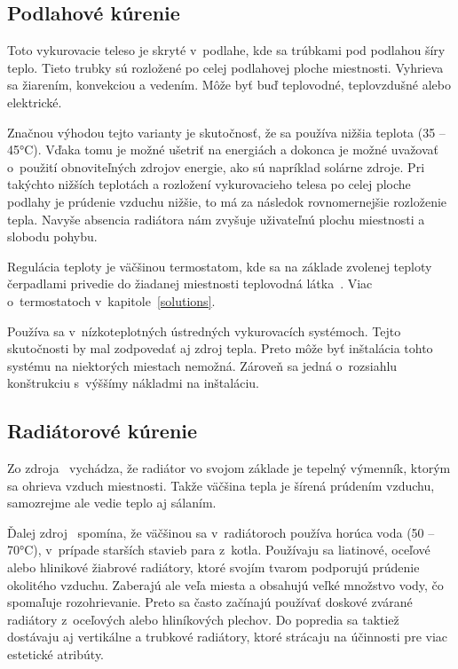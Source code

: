 \subsection*{Podlahové kúrenie}
Toto vykurovacie teleso je skryté v~podlahe, kde sa trúbkami pod podlahou šíry teplo. 
Tieto trubky sú rozložené po celej podlahovej ploche miestnosti. Vyhrieva sa žiarením, konvekciou a vedením. 
Môže byť buď teplovodné, teplovzdušné alebo elektrické.~\cite{tuffin_2018}

Značnou výhodou tejto varianty je skutočnosť, že sa používa nižšia teplota (35 – 45°C). 
Vďaka tomu je možné ušetriť na energiách a dokonca je možné uvažovať o~použití obnoviteľných zdrojov energie, ako sú napríklad solárne zdroje. 
Pri takýchto nižších teplotách a rozložení vykurovacieho telesa po celej ploche podlahy je prúdenie vzduchu nižšie, to má za následok rovnomernejšie rozloženie tepla. 
Navyše absencia radiátora nám zvyšuje uživateľnú plochu miestnosti a slobodu pohybu.~\cite{olesen2002radiant}

Regulácia teploty je väčšinou termostatom, kde sa na základe zvolenej teploty čerpadlami privedie do žiadanej miestnosti teplovodná látka~\cite{olesen2002radiant}. 
Viac o~termostatoch v~kapitole~\ref{solutions}.

Používa sa v~nízkoteplotných ústredných vykurovacích systémoch. 
Tejto skutočnosti by mal zodpovedať aj zdroj tepla. 
Preto môže byť inštalácia tohto systému na niektorých miestach nemožná. 
Zároveň sa jedná o~rozsiahlu konštrukciu s~výššímy nákladmi na inštaláciu.



\subsection*{Radiátorové kúrenie}
Zo zdroja~\cite{radiator_2014} vychádza, že radiátor vo svojom základe je tepelný výmenník, ktorým sa ohrieva vzduch miestnosti. 
Takže väčšina tepla je šírená prúdením vzduchu, samozrejme ale vedie teplo aj sálaním.

Ďalej zdroj~\cite{radiator_2014} spomína, že väčšinou sa v~radiátoroch používa horúca voda (50 – 70°C), v~prípade starších stavieb para z~kotla. 
Používaju sa liatinové, oceľové alebo hlinikové žiabrové radiátory, ktoré svojím tvarom podporujú prúdenie okolitého vzduchu. 
Zaberajú ale veľa miesta a obsahujú veľké množstvo vody, čo spomaľuje rozohrievanie. 
Preto sa často začínajú používať doskové zvárané radiátory z~oceľových alebo hliníkových plechov. 
Do popredia sa taktiež dostávaju aj vertikálne a trubkové radiátory, ktoré strácaju na účinnosti pre viac estetické atribúty.

